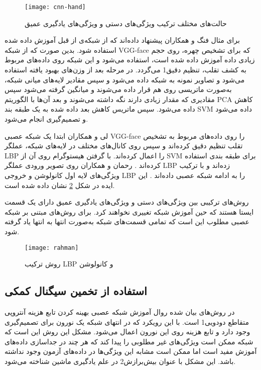 \begin{figure}[t]
	\centerline{\texttt{[image: cnn-hand]}}
	\caption{حالت‌های مختلف ترکیب ویژگی‌های دستی و ویژگی‌های یادگیری عمیق \cite{yu2021deep}}
	\label{fig:cnn-hand}
\end{figure}

برای مثال فنگ و همکاران 
\cite{li2016original} 
پیشنهاد داده‌اند که از شبکه‌ی از قبل آموزش داده شده استفاده شود. بدین صورت که از شبکه
 VGG-face \cite{parkhi2015deep}
 که برای تشخیص چهره، روی حجم زیادی داده آموزش داده شده است، استفاده می‌شود و این شبکه روی داده‌های مربوط به کشف تقلب، تنظیم دقیق1 می‌گردد. در مرحله بعد از وزن‌های بهبود یافته استفاده می‌شود و تصاویر نمونه به شبکه داده می‌شود و سپس مقادیر لایه‌های میانی شبکه، به‌صورت ماتریسی روی هم قرار داده می‌شوند و میانگین گرفته می‌شود سپس مقادیری که مقدار زیادی دارند نگه داشته می‌شوند و بعد آن‌ها با الگوریتم PCA کاهش داده می‌شود. سپس ماتریس کاهش بعد داده شده به یک طبقه بند SVM داده می‌شود و تصمیم‌گیری انجام می‌شود. 

لی و همکاران ابتدا یک شبکه عصبی VGG-face را روی داده‌های مربوط به تشخیص تقلب تنظیم دقیق کرده‌اند و سپس روی کانال‌های مختلف در لایه‌های شبکه، عملگر LBP را اعمال کرده‌اند. با گرفتن هیستوگرام روی آن از SVM برای طبقه بندی استفاده کرده‌اند
\cite{li2019face}.
رحمان و همکاران روی تصویر ورودی عملگر LBP زده‌اند و با ترکیب ویژگی‌های لایه اول کانولوشن و خروجی LBP را به ادامه شبکه عصبی داده‌اند
\cite{rehman2020enhancing}. 
 این ایده در شکل
\ref{fig:rahman}
نشان داده شده است.

روش‌های ترکیبی بین ویژگی‌های دستی و ویژگی‌های یادگیری عمیق دارای یک قسمت ایستا هستند که حین آموزش شبکه تغییری نخواهند کرد. برای روش‌های مبتنی بر شبکه عصبی مطلوب این است که تمامی قسمت‌های شبکه به‌صورت انتها به انتها یاد گرفته شود.
\begin{figure}[hb]
	\centerline{\texttt{[image: rahman]}}
	\caption{روش ترکیب LBP و کانولوشن \cite{rehman2020enhancing}}
	\label{fig:rahman}
\end{figure}

\subsection{استفاده از تخمین سیگنال کمکی}
در روش‌های بیان شده روال آموزش شبکه عصبی بهینه کردن تابع هزینه آنتروپی متقاطع دودویی1 است. با این رویکرد که در انتهای شبکه یک نورون برای تصمیم‌گیری وجود دارد و تابع هزینه روی این نورون اعمال می‌شود. مشکل این روش این است که شبکه ممکن است ویژگی‌های غیر مطلوبی را پیدا کند که هر چند در جداسازی داده‌های آموزش مفید است اما ممکن است مشابه این ویژگی‌ها در داده‌های آزمون وجود نداشته باشد. این مشکل با عنوان بیش‌برازش2 در علم یادگیری ماشین شناخته می‌شود.

